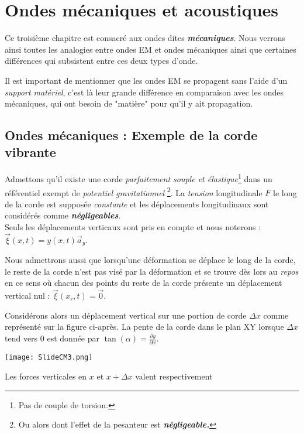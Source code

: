 \chapter{Ondes mécaniques et acoustiques} 

Ce troisième chapitre est consacré aux ondes dites \textit{\textbf{mécaniques}}. Nous verrons ainsi toutes les analogies entre ondes EM et ondes mécaniques ainsi que certaines différences qui subsistent entre ces deux types d'onde.

Il est important de mentionner que les ondes EM se propagent sans l'aide d'un \textit{support matériel}, c'est là leur grande différence en comparaison avec les ondes mécaniques, qui ont besoin de "matière" pour qu'il y ait propagation. 

\section{Ondes mécaniques : Exemple de la corde vibrante}

Admettons qu'il existe une corde \textit{parfaitement souple et élastique}\footnote{Pas de couple de torsion.} dans un référentiel exempt de \textit{potentiel gravitationnel} \footnote{Ou alors dont l'effet de la pesanteur est \textit{\textbf{négligeable.}}}. La \textit{tension} longitudinale $F$ le long de la corde est supposée \textit{constante} et les déplacements longitudinaux sont considérés comme \textit{\textbf{négligeables}}. \\Seuls les déplacements verticaux sont pris en compte et nous noterons : $\vec{\xi}(x,t) = y(x,t) \vec{a}_{y}$.

Nous admettrons aussi que lorsqu'une déformation se déplace le long de la corde, le reste de la corde n'est pas visé par la déformation et se trouve dès lors au \textit{repos} en ce sens où chacun des points du reste de la corde présente un déplacement vertical nul : $\vec{\xi}(x_{r},t) = \vec{0}$.

Considérons alors un déplacement vertical sur une portion de corde $\Delta x$ comme représenté sur la figure ci-après.  La pente de la corde dans le plan XY lorsque $\Delta x$ tend vers $0$ est donnée par $\tan (\alpha) = \frac{\partial y}{\partial x}$.

\begin{center}
	\texttt{[image: SlideCM3.png]}
\end{center}

Les forces verticales en $x$ et $x+\Delta x$ valent respectivement

